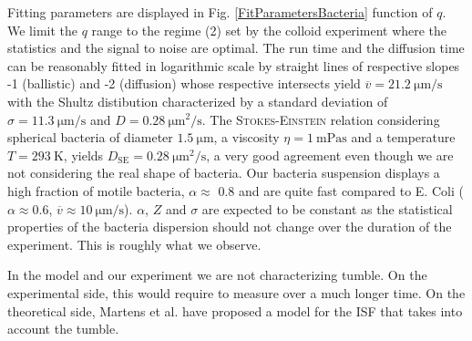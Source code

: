 \documentclass[%
 aip,
 jmp,%
 amsmath,amssymb,
reprint,%
]{revtex4-1}
\begin{document}
Fitting parameters are displayed in Fig. \ref{FitParametersBacteria} function of $q$. We limit the $q$ range to the regime (2) set by the colloid experiment where the statistics and the signal to noise are optimal. The run time and the diffusion time can be reasonably fitted in logarithmic scale by straight lines of respective slopes -1 (ballistic) and -2 (diffusion) whose respective intersects yield $\overline{v} = \SI{21.2}{\micro\meter\per\second}$ with the Shultz distibution characterized by a standard deviation of $\sigma=\SI{11.3}{\micro\meter\per\second}$ and $D = \SI{0.28}{\micro\meter\squared\per\second}$. The \textsc{Stokes-Einstein} relation considering spherical bacteria of diameter $\SI{1.5}{\micro\meter}$, a viscosity $\eta = \SI{1}{\milli\pascal\second}$ and a temperature $T=\SI{293}{\kelvin}$, yields $D_\text{SE} = \SI{0.28}{\micro\meter\squared\per\second}$, a very good agreement even though we are not considering the real shape of bacteria. Our bacteria suspension displays a high fraction of motile bacteria, $\alpha\approx$ 0.8 and are quite fast compared to E. Coli ($\alpha\approx 0.6$, $\overline{v} \approx \SI{10}{\micro\meter\per\second}$)\cite{4_Martinez20121637}. $\alpha$, $Z$ and $\sigma$ are expected to be constant as the statistical properties of the bacteria dispersion should not change over the duration of the experiment. This is roughly what we observe.

In the model and our experiment we are not characterizing tumble. On the experimental side, this would require to measure over a much longer time. On the theoretical side, Martens et al. \cite{6_martens2012probability} have proposed a model for the ISF that takes into account the tumble.
\end{document}

